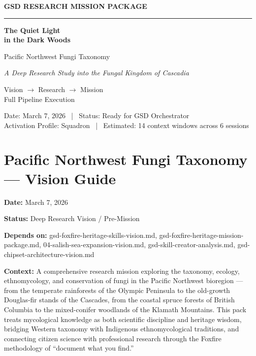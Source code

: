 \documentclass[11pt,letterpaper]{article}
\newcommand{\stageheader}[2]{%
  \noindent\colorbox{#2}{\makebox[\textwidth][l]{%
    \textcolor{white}{\bfseries\sffamily\hspace{6pt}#1\hspace{6pt}}}}%
  \vspace{0.5em}\par%
}
\newcommand{\metafield}[2]{\textbf{\sffamily #1} #2\par}
\begin{document}
\thispagestyle{empty}
\begin{center}
\vspace*{3cm}

{\small\sffamily\textcolor{primary}{\textbf{GSD RESEARCH MISSION PACKAGE}}}

\vspace{0.3cm}
\textcolor{bordergray}{\rule{8cm}{0.4pt}}

\vspace{1.5cm}
{\fontsize{28}{34}\selectfont\bfseries\sffamily\textcolor{primary}{The Quiet Light\\[0.3em]in the Dark Woods}}

\vspace{0.8cm}
{\Large\sffamily\textcolor{secondary}{Pacific Northwest Fungi Taxonomy}}

\vspace{0.5cm}
{\large\sffamily\itshape\textcolor{tertiary}{A Deep Research Study into the Fungal Kingdom of Cascadia}}

\vspace{3cm}
{\sffamily\textcolor{accent}{Vision $\rightarrow$ Research $\rightarrow$ Mission}}\\[0.3em]
{\small\sffamily\textcolor{accent}{Full Pipeline Execution}}

\vspace{3cm}
{\small\sffamily\textcolor{subtlegray}{Date: March 7, 2026 ~|~ Status: Ready for GSD Orchestrator}}\\[0.3em]
{\small\sffamily\textcolor{subtlegray}{Activation Profile: Squadron ~|~ Estimated: 14 context windows across 6 sessions}}
\end{center}
\newpage

\tableofcontents
\newpage

\stageheader{STAGE 1 --- VISION DOCUMENT}{primary}

\section{Pacific Northwest Fungi Taxonomy --- Vision Guide}

\metafield{Date:}{March 7, 2026}
\metafield{Status:}{Deep Research Vision / Pre-Mission}
\metafield{Depends on:}{gsd-foxfire-heritage-skills-vision.md, gsd-foxfire-heritage-mission-package.md, 04-salish-sea-expansion-vision.md, gsd-skill-creator-analysis.md, gsd-chipset-architecture-vision.md}
\metafield{Context:}{A comprehensive research mission exploring the taxonomy, ecology, ethnomycology, and conservation of fungi in the Pacific Northwest bioregion --- from the temperate rainforests of the Olympic Peninsula to the old-growth Douglas-fir stands of the Cascades, from the coastal spruce forests of British Columbia to the mixed-conifer woodlands of the Klamath Mountains. This pack treats mycological knowledge as both scientific discipline and heritage wisdom, bridging Western taxonomy with Indigenous ethnomycological traditions, and connecting citizen science with professional research through the Foxfire methodology of ``document what you find.''}
\end{document}
